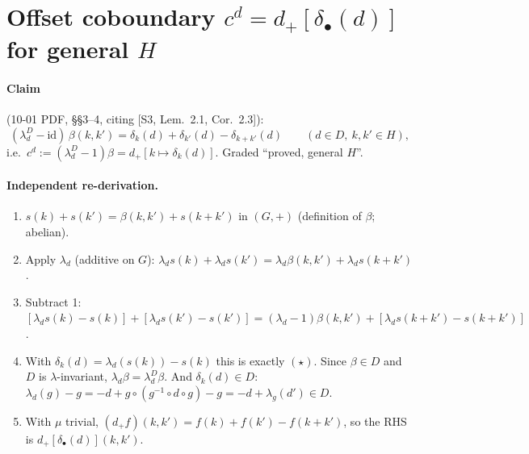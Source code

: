 \documentclass[11pt]{article}
\newcommand{\dplus}{d_{+}}
\begin{document}
\section{Offset coboundary $c^d=\dplus[\delta_\bullet(d)]$ for general $H$}

\paragraph{Claim} (10-01 PDF, \S\S3--4, citing [S3, Lem.~2.1, Cor.~2.3]):
\begin{equation}\tag{$\star$}
(\lambda^D_d-\mathrm{id})\,\beta(k,k')=\delta_k(d)+\delta_{k'}(d)-\delta_{k+k'}(d)
\qquad(d\in D,\ k,k'\in H),
\end{equation}
i.e.\ $c^d:=(\lambda^D_d-1)\beta=\dplus[k\mapsto\delta_k(d)]$. Graded ``proved, general $H$''.

\paragraph{Independent re-derivation.}
\begin{enumerate}[leftmargin=*]
\item $s(k)+s(k')=\beta(k,k')+s(k+k')$ in $(G,+)$ (definition of $\beta$; abelian).
\item Apply $\lambda_d$ (additive on $G$):
$\lambda_d s(k)+\lambda_d s(k')=\lambda_d\beta(k,k')+\lambda_d s(k+k')$.
\item Subtract 1:
$[\lambda_d s(k)-s(k)]+[\lambda_d s(k')-s(k')]=(\lambda_d-1)\beta(k,k')+[\lambda_d s(k+k')-s(k+k')]$.
\item With $\delta_k(d)=\lambda_d(s(k))-s(k)$ this is exactly $(\star)$. Since
$\beta\in D$ and $D$ is $\lambda$-invariant, $\lambda_d\beta=\lambda^D_d\beta$. And
$\delta_k(d)\in D$: $\lambda_d(g)-g=-d+g\circ(g^{-1}\circ d\circ g)-g=-d+\lambda_g(d')\in D$.
\item With $\mu$ trivial, $(\dplus f)(k,k')=f(k)+f(k')-f(k+k')$, so the RHS is
$\dplus[\delta_\bullet(d)](k,k')$.
\end{enumerate}
\end{document}
